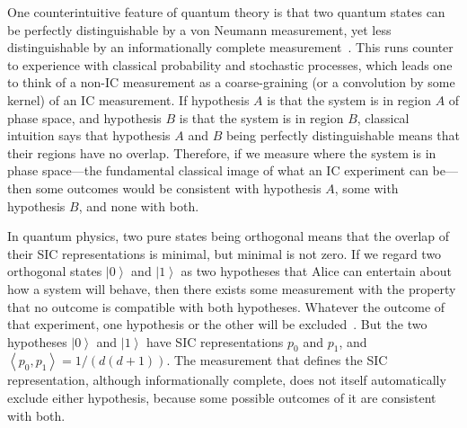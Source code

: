 \documentclass[aps,pra,superscriptaddress,10pt,tightenlines,twocolumn,nofootinbib]{revtex4}
\theoremstyle{remark}
\newcommand{\inprod}[2]{{\left\langle #1 , #2 \right\rangle}}
\newcommand{\ket}[1]{{\left| #1 \right \rangle}}
\begin{document}
One counterintuitive feature of quantum theory is that two quantum states can be perfectly distinguishable by a von Neumann measurement, yet less distinguishable by an informationally complete measurement~\cite{CFS2002, stacey-qutrit, stacey-hoggar}.  This runs counter to experience with classical probability and stochastic processes, which leads one to think of a non-IC measurement as a coarse-graining (or a convolution by some kernel) of an IC measurement.  If hypothesis $A$ is that the system is in region $A$ of phase space, and hypothesis $B$ is that the system is in region $B$, classical intuition says that hypothesis $A$ and $B$ being perfectly distinguishable means that their regions have no overlap.  Therefore, if we measure where the system is in phase space---the fundamental classical image of what an IC experiment can be---then some outcomes would be consistent with hypothesis $A$, some with hypothesis $B$, and none with both.

In quantum physics, two pure states being orthogonal means that the overlap of their SIC representations is minimal, but minimal is not zero.  If we regard two orthogonal states $\ket{0}$ and $\ket{1}$ as two hypotheses that Alice can entertain about how a system will behave, then there exists some measurement with the property that no outcome is compatible with both hypotheses.  Whatever the outcome of that experiment, one hypothesis or the other will be excluded~\cite{CFS2002}.  But the two hypotheses $\ket{0}$ and $\ket{1}$ have SIC representations $p_0$ and $p_1$, and $\inprod{p_0}{p_1} = 1/(d(d+1))$.  The measurement that defines the SIC representation, although informationally complete, does not itself automatically exclude either hypothesis, because some possible outcomes of it are consistent with both.
\end{document}
